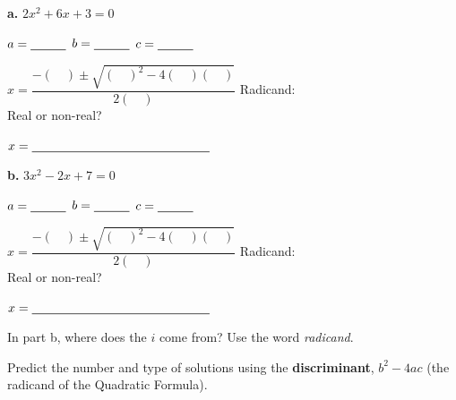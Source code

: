 \begin{minipage}[t]{0.48\textwidth}
\textbf{a.} $2x^2+6x+3=0$

\vspace{2pt}
$a=\blank[1cm]$ \quad $b=\blank[1cm]$ \quad $c=\blank[1cm]$

\vspace{2pt}
$x=\dfrac{-(\phantom{00})\pm\sqrt{(\phantom{00})^2-4(\phantom{00})(\phantom{00})}}{2(\phantom{00})}$
\lines[5]
\vspace{4pt}
Radicand: \blank[1.6cm]\\[4pt]
Real or non-real? \blank[2.2cm]

$x=\blank[5cm]$
\end{minipage}\hfill
\begin{minipage}[t]{0.48\textwidth}
\textbf{b.} $3x^2-2x+7=0$

\vspace{2pt}
$a=\blank[1cm]$ \quad $b=\blank[1cm]$ \quad $c=\blank[1cm]$

\vspace{2pt}
$x=\dfrac{-(\phantom{00})\pm\sqrt{(\phantom{00})^2-4(\phantom{00})(\phantom{00})}}{2(\phantom{00})}$
\lines[5]
\vspace{4pt}
Radicand: \blank[1.6cm]\\[4pt]
Real or non-real? \blank[2.2cm]

$x=\blank[5cm]$
\end{minipage}

In part b, where does the $i$ come from? Use the word \emph{radicand}.\lines[2]

\vspace{4pt}

Predict the number and type of solutions using the \textbf{discriminant}, $b^2-4ac$ (the radicand of the Quadratic Formula).

